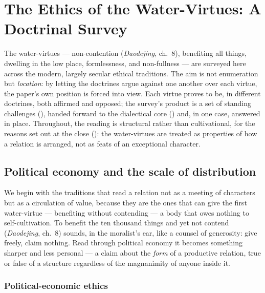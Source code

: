 \section{The Ethics of the Water-Virtues: A Doctrinal Survey}
\label{p20:sec:review}

\noindent
The water-virtues --- non-contention (\emph{Daodejing}, ch.~8), benefiting all things, dwelling in the low place, formlessness, and non-fullness --- are surveyed here across the modern, largely secular ethical traditions. The aim is not enumeration but \emph{location}: by letting the doctrines argue against one another over each virtue, the paper's own position is forced into view. Each virtue proves to be, in different doctrines, both affirmed and opposed; the survey's product is a set of standing challenges (), handed forward to the dialectical core () and, in one case, answered in place. Throughout, the reading is structural rather than cultivational, for the reasons set out at the close (): the water-virtues are treated as properties of how a relation is arranged, not as feats of an exceptional character.


\subsection{Political economy and the scale of distribution}
\label{p20:sub:review-polecon}

We begin with the traditions that read a relation not as a meeting of characters but as a circulation of value, because they are the ones that can give the first water-virtue --- benefiting without contending --- a body that owes nothing to self-cultivation. To benefit the ten thousand things and yet not contend (\emph{Daodejing}, ch.~8) sounds, in the moralist's ear, like a counsel of generosity: give freely, claim nothing. Read through political economy it becomes something sharper and less personal --- a claim about the \emph{form} of a productive relation, true or false of a structure regardless of the magnanimity of anyone inside it.

\subsubsection{Political-economic ethics}
\label{p20:ssub:review-marx}

